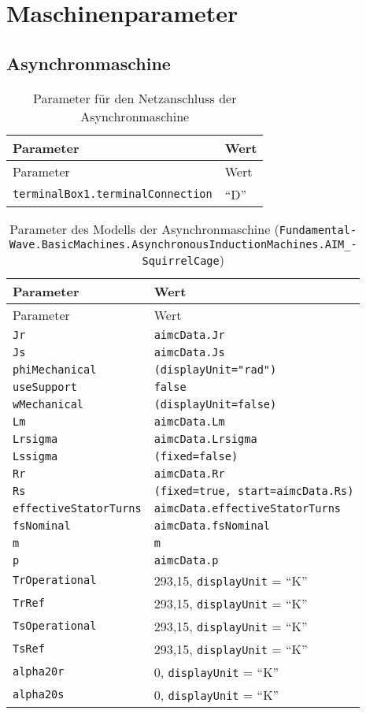 \hypertarget{maschinenparameter}{%
\section{Maschinenparameter}\label{maschinenparameter}}

\hypertarget{asynchronmaschine}{%
\subsection{Asynchronmaschine}\label{asynchronmaschine}}

\begin{longtable}[]{@{}ll@{}}
\caption{Parameter für den Netzanschluss der
Asynchronmaschine}\tabularnewline
\toprule
Parameter & Wert\tabularnewline
\midrule
\endfirsthead
\toprule
Parameter & Wert\tabularnewline
\midrule
\endhead
\texttt{terminalBox1.terminalConnection} & ``D''\tabularnewline
\bottomrule
\end{longtable}

\begin{longtable}[]{@{}ll@{}}
\caption{Parameter des Modells der Asynchronmaschine
(\texttt{Fun­da­men­tal­Wave.­Basic­Ma­chines.­Asyn­chro­nous­In­duc­tion­Ma­chines.­AIM\_­Squir­rel­Cage})}\tabularnewline
\toprule
Parameter & Wert\tabularnewline
\midrule
\endfirsthead
\toprule
Parameter & Wert\tabularnewline
\midrule
\endhead
\texttt{Jr} & \texttt{aimcData.Jr}\tabularnewline
\texttt{Js} & \texttt{aimcData.Js}\tabularnewline
\texttt{phiMechanical} & \texttt{(displayUnit="rad")}\tabularnewline
\texttt{useSupport} & \texttt{false}\tabularnewline
\texttt{wMechanical} & \texttt{(displayUnit=false)}\tabularnewline
\texttt{Lm} & \texttt{aimcData.Lm}\tabularnewline
\texttt{Lrsigma} & \texttt{aimcData.Lrsigma}\tabularnewline
\texttt{Lssigma} & \texttt{(fixed=false)}\tabularnewline
\texttt{Rr} & \texttt{aimcData.Rr}\tabularnewline
\texttt{Rs} & \texttt{(fixed=true,\ start=aimcData.Rs)}\tabularnewline
\texttt{effectiveStatorTurns} &
\texttt{aimcData.effectiveStatorTurns}\tabularnewline
\texttt{fsNominal} & \texttt{aimcData.fsNominal}\tabularnewline
\texttt{m} & \texttt{m}\tabularnewline
\texttt{p} & \texttt{aimcData.p}\tabularnewline
\texttt{TrOperational} & 293,15, \texttt{displayUnit} =
``K''\tabularnewline
\texttt{TrRef} & 293,15, \texttt{displayUnit} = ``K''\tabularnewline
\texttt{TsOperational} & 293,15, \texttt{displayUnit} =
``K''\tabularnewline
\texttt{TsRef} & 293,15, \texttt{displayUnit} = ``K''\tabularnewline
\texttt{alpha20r} & 0, \texttt{displayUnit} = ``K''\tabularnewline
\texttt{alpha20s} & 0, \texttt{displayUnit} = ``K''\tabularnewline
\bottomrule
\end{longtable}

